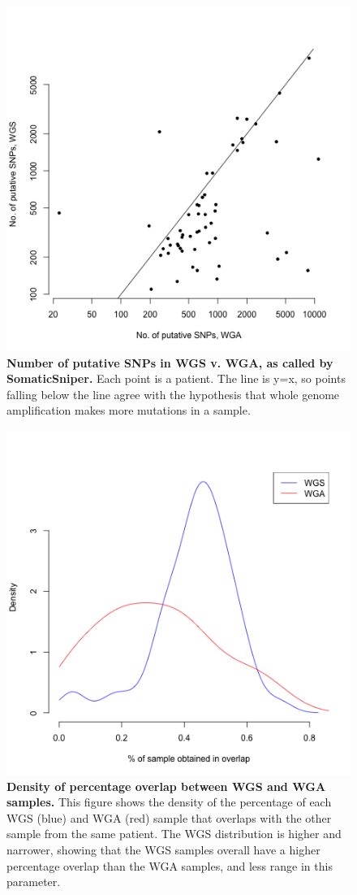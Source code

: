 \documentclass[11pt]{article} %
\begin{document}
\begin{figure}
\includegraphics[scale=1.0]{C282_v_C484.png}
\caption{\textbf{Number of putative SNPs in WGS v. WGA, as called by SomaticSniper.} Each point is a patient. The line is y=x, so points falling below the line agree with the hypothesis that whole genome amplification makes more mutations in a sample.}
\end{figure}

\begin{figure}
\includegraphics[scale=1.0]{unfiltered_overlap_WGS_WGA_together_densities.png}
\caption{\textbf{Density of percentage overlap between WGS and WGA samples.} This figure shows the density of the percentage of each WGS (blue) and WGA (red) sample that overlaps with the other sample from the same patient. The WGS distribution is higher and narrower, showing that the WGS samples overall have a higher percentage overlap than the WGA samples, and less range in this parameter. }
\end{figure}
\end{document}
